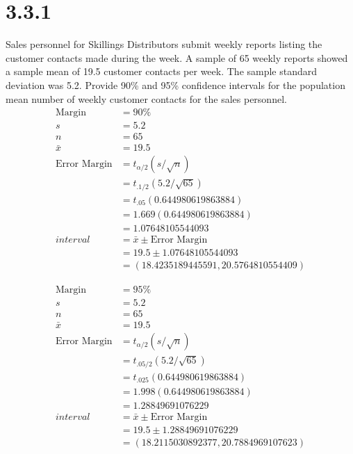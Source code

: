 \documentclass{article}
\begin{document}
\section*{3.3.1}
Sales personnel for Skillings Distributors submit weekly reports listing the customer contacts made during the week.
A sample of 65 weekly reports showed a sample mean of 19.5 customer contacts per week. The sample standard deviation was 5.2.
Provide 90\% and 95\% confidence intervals for the population mean number of weekly customer contacts for the sales personnel.
\begin{align*}
  \text{Margin} &= 90\%\\
  s &= 5.2\\
  n &= 65\\
  \bar{x} &= 19.5\\
  \text{Error Margin} &= t_{\alpha/2}(s/ \sqrt{n})\\
  &=t_{.1/2}(5.2/ \sqrt{65})\\
  &=t_{.05}(0.644980619863884)\\
  &=1.669(0.644980619863884)\\
  &=1.07648105544093\\
  interval &= \bar{x} \pm \text{Error Margin}\\
  &= 19.5 \pm 1.07648105544093\\
  &= (18.4235189445591, 20.5764810554409)
\end{align*}

\begin{align*}
  \text{Margin} &= 95\%\\
  s &= 5.2\\
  n &= 65\\
  \bar{x} &= 19.5\\
  \text{Error Margin} &= t_{\alpha/2}(s/ \sqrt{n})\\
  &=t_{.05/2}(5.2/ \sqrt{65})\\
  &=t_{.025}(0.644980619863884)\\
  &=1.998(0.644980619863884)\\
  &=1.28849691076229\\
  interval &= \bar{x} \pm \text{Error Margin}\\
  &= 19.5 \pm 1.28849691076229\\
  &= (18.2115030892377, 20.7884969107623)
\end{align*}
\end{document}

